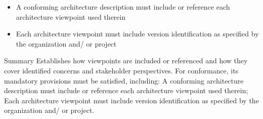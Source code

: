 \documentclass[10pt,letterpaper]{article}
\begin{document}
\begin{CornellNotesTable}
{\begin{itemize}[leftmargin=*,nosep,topsep=1pt]
\item A conforming architecture description must include or reference each architecture viewpoint used therein
\item Each architecture viewpoint must include version identification as specified by the organization and/ or project
\end{itemize}}
\end{CornellNotesTable}


\begin{CornellSummaryBox}{Summary}
Establishes how viewpoints are included or referenced and how they cover identified concerns and stakeholder perspectives. For conformance, its mandatory provisions must be satisfied, including: A conforming architecture description must include or reference each architecture viewpoint used therein; Each architecture viewpoint must include version identification as specified by the organization and/ or project.
\end{CornellSummaryBox}
\end{document}
